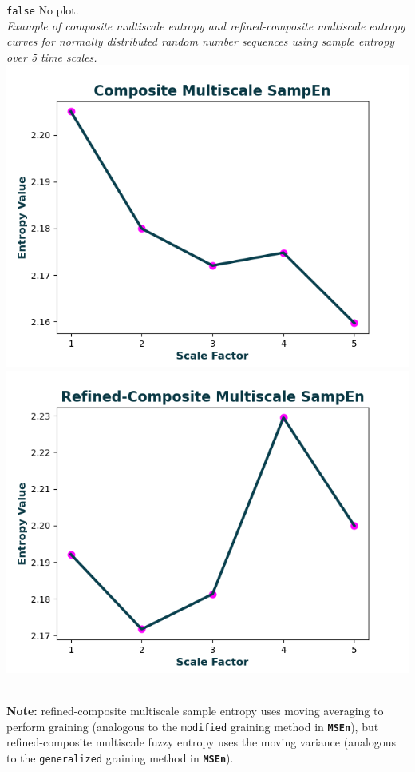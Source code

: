 \documentclass[12pt, a4paper, titlepage, openany]{book}
\begin{document}
\begin{description}[labelsep=1cm, labelwidth=2cm, nosep, style=multiline,leftmargin=3cm]
							\texttt{false}\hspace{12pt} No plot.\\ 							\textit{Example of composite multiscale entropy and refined-composite multiscale entropy curves for normally distributed random number sequences using sample entropy over 5 time scales.}\\
							\includegraphics[scale=.7]{cMSEn1.png}\\
							\includegraphics[scale=.7]{rcMSEn1.png}
\end{description}

\ \\ \textbf{Note:} refined-composite multiscale sample entropy uses moving averaging to perform graining (analogous to the \texttt{modified} graining method in \texttt{\textbf{MSEn}}), but refined-composite multiscale fuzzy entropy uses the moving variance (analogous to the \texttt{generalized} graining method in \texttt{\textbf{MSEn}}). 
\end{document}
